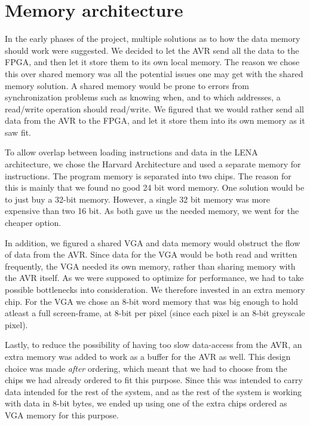\section {Memory architecture}
 In the early phases of the project,
multiple solutions as to how the data memory should work were suggested. We
decided to let the AVR send all the data to the \ac{FPGA}, and then let it store
them to its own local memory. The reason we chose this over shared memory was
all the potential issues one may get with the shared memory solution. A shared memory
would be prone to errors from synchronization problems such as knowing when,
and to which addresses, a read/write operation should read/write. We figured
that we would rather send all data from the AVR to the \ac{FPGA}, and let it
store them into its own memory as it saw fit.

To allow overlap between loading instructions and data in the LENA
architecture, we chose the Harvard Architecture and used a separate memory for
instructions. The program memory is
separated into two chips. The reason for this is mainly that we found no good 24
bit word memory. One solution would be to just buy a 32-bit memory. However, a single 32
bit memory was more expensive than two 16 bit. As both gave us the needed memory,
we went for the cheaper option.

 In addition, we figured a shared \ac{VGA} and data memory would obstruct the flow
of data from the AVR. Since data for the \ac{VGA} would be both read and written
frequently, the \ac{VGA} needed its own memory, rather than sharing memory with
the AVR itself. As we were supposed to optimize for performance, we had to take
possible bottlenecks into consideration. We therefore invested in an extra
memory chip. For the VGA we chose an 8-bit word memory that was big enough to
hold atleast a full screen-frame, at 8-bit per pixel (since each pixel is an 8-bit greyscale pixel).

Lastly, to reduce the possibility of having too slow data-access from the AVR, an extra memory was added to work as
a buffer for the AVR as well. This design choice was made {\em after} ordering, which meant that we had to choose from
the chips we had already ordered to fit this purpose. Since this was intended to carry data intended for the rest
of the system, and as the rest of the system is working with data in 8-bit bytes, we ended up using one of the
extra chips ordered as \ac{VGA} memory for this purpose.

